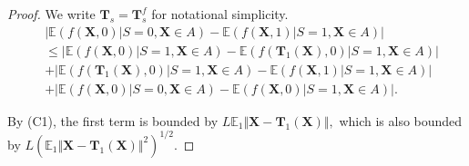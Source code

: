 \documentclass[10pt]{article} %
\begin{document}
\begin{proof}
    We write $\mathbf{T}_{s} = \mathbf{T}_{s}^{f}$ for notational simplicity.
    \begin{equation}
        \begin{split}
            & \vert \mathbb{E} ( f( \mathbf{X}, 0 ) | S = 0, \mathbf{X} \in A ) - \mathbb{E} ( f( \mathbf{X}, 1 ) | S = 1, \mathbf{X} \in A ) \vert
            \\ 
            & \le \vert \mathbb{E} ( f( \mathbf{X}, 0 ) | S = 1, \mathbf{X} \in A ) - \mathbb{E} ( f( \mathbf{T}_{1}(\mathbf{X}), 0 ) | S = 1, \mathbf{X} \in A ) \vert 
            \\ 
            & + \vert \mathbb{E} ( f( \mathbf{T}_{1}(\mathbf{X}), 0 ) | S = 1, \mathbf{X} \in A ) - \mathbb{E} ( f( \mathbf{X}, 1 ) | S = 1, \mathbf{X} \in A ) \vert
            \\ 
            & + \vert \mathbb{E} ( f( \mathbf{X}, 0 ) | S = 0, \mathbf{X} \in A ) - \mathbb{E} ( f( \mathbf{X}, 0 ) | S = 1, \mathbf{X} \in A ) \vert.
        \end{split}
    \end{equation}

    By (C1),
    the first term is bounded by $L \mathbb{E}_{1} \Vert \mathbf{X} - \mathbf{T}_{1}(\mathbf{X}) \Vert,$
    which is also bounded by 
    $
    L \left( \mathbb{E}_{1} \Vert \mathbf{X} - \mathbf{T}_{1}(\mathbf{X}) \Vert^{2} \right)^{1/2}.
    $


\end{proof}
\end{document}
